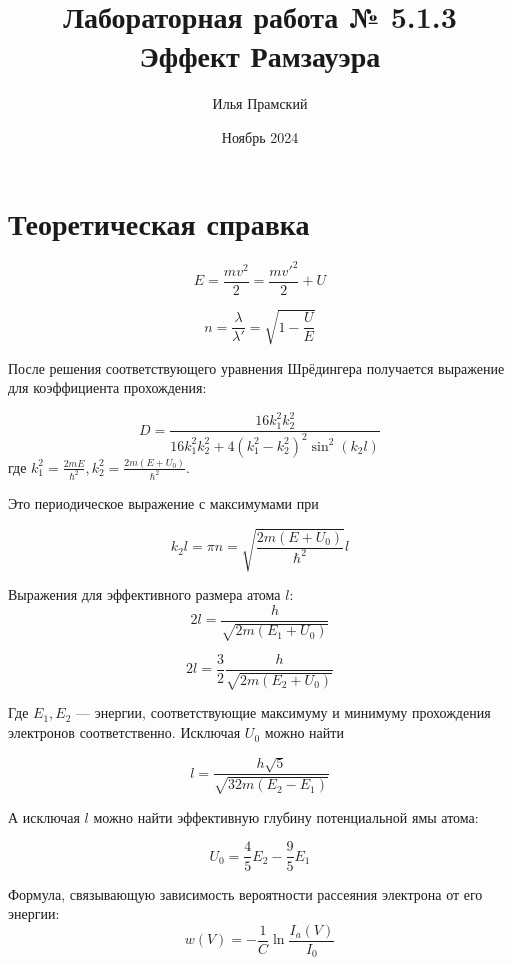 \documentclass[a4paper,12pt]{article}
\title{Лабораторная работа № 5.1.3\\Эффект Рамзауэра}
\author{Илья Прамский}
\date{Ноябрь 2024}
\begin{document}
\maketitle
\newpage
\section*{Теоретическая справка}
\[E = \frac{mv^2}{2} = \frac{mv'^2}{2}+U\]

\begin{equation}
n = \frac{\lambda}{\lambda'} = \sqrt{1 - \frac{U}{E}}
\end{equation}

После решения соответствующего уравнения Шрёдингера получается выражение для коэффициента прохождения:

\begin{equation}
D = \frac{16 k_1^2 k_2^2}{16k_1^2 k_2^2 + 4\left(k_1^2-k_2^2\right)^2\sin^2\left(k_2 l\right)}
\end{equation}
где $k_1^2 = \frac{2mE}{\hbar^2}, k_2^2 = \frac{2m(E + U_0)}{\hbar^2}$.

Это периодическое выражение с максимумами при 

\begin{equation}
k_2 l = \pi n = \sqrt{\frac{2m(E + U_0)}{\hbar^2}}l
\end{equation}

Выражения для эффективного размера атома $l$:
\begin{equation}
2l = \frac{h}{\sqrt{2m(E_1 + U_0)}}
\end{equation}

\begin{equation}
2l = \frac{3}{2}\frac{h}{\sqrt{2m(E_2 + U_0)}}
\end{equation}

Где $E_1, E_2$ --- энергии, соответствующие максимуму и минимуму прохождения электронов соответственно. Исключая $U_0$ можно найти 

\begin{equation}
l = \frac{h\sqrt{5}}{\sqrt{32m(E_2 - E_1)}}
\end{equation}

А исключая $l$ можно найти эффективную глубину потенциальной ямы атома:

\begin{equation}
U_0 = \frac{4}{5}E_2 - \frac{9}{5}E_1
\end{equation}

Формула, связывающую зависимость вероятности рассеяния электрона от его энергии:
\begin{equation}
w(V) = -\frac{1}{C} \ln \frac{I_a(V)}{I_0}
\end{equation}
\end{document}

